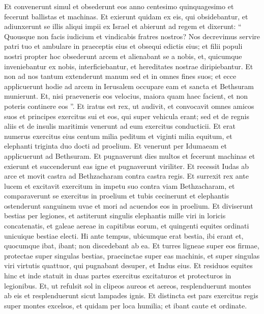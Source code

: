 \begin{biblechapter}
\begin{biblechapter}
\begin{biblechapter}
\begin{biblechapter}
\begin{biblechapter}
\begin{biblechapter}
\verse Et convenerunt simul et obsederunt eos anno centesimo quinquagesimo et fecerunt ballistas et machinas. 
\verse Et exierunt quidam ex eis, qui obsidebantur, et adiunxerunt se illis aliqui impii ex Israel 
\verse et abierunt ad regem et dixerunt: “ Quousque non facis iudicium et vindicabis fratres nostros? 
\verse Nos decrevimus servire patri tuo et ambulare in praeceptis eius et obsequi edictis eius; 
\verse et filii populi nostri propter hoc obsederunt arcem et alienabant se a nobis, et, quicumque inveniebantur ex nobis, interficiebantur, et hereditates nostrae diripiebantur. 
\verse Et non ad nos tantum extenderunt manum sed et in omnes fines suos; 
\verse et ecce applicuerunt hodie ad arcem in Ierusalem occupare eam et sancta et Bethsuram munierunt. 
\verse Et, nisi praeveneris eos velocius, maiora quam haec facient, et non poteris continere eos ”.
 \verse Et iratus est rex, ut audivit, et convocavit omnes amicos suos et principes exercitus sui et eos, qui super vehicula erant; 
\verse sed et de regnis aliis et de insulis maritimis venerunt ad eum exercitus conducticii. 
\verse Et erat numerus exercitus eius centum milia peditum et viginti milia equitum, et elephanti triginta duo docti ad proelium. 
\verse Et venerunt per Idumaeam et applicuerunt ad Bethsuram. Et pugnaverunt dies multos et fecerunt machinas et exierunt et succenderunt eas igne et pugnaverunt viriliter. 
\verse Et recessit Iudas ab arce et movit castra ad Bethzacharam contra castra regis. 
\verse Et surrexit rex ante lucem et excitavit exercitum in impetu suo contra viam Bethzacharam, et comparaverunt se exercitus in proelium et tubis cecinerunt 
 \verse et elephantis ostenderunt sanguinem uvae et mori ad acuendos eos in proelium. 
 \verse Et diviserunt bestias per legiones, et astiterunt singulis elephantis mille viri in loricis concatenatis, et galeae aereae in capitibus eorum, et quingenti equites ordinati unicuique bestiae electi. 
\verse Hi ante tempus, ubicumque erat bestia, ibi erant et, quocumque ibat, ibant; non discedebant ab ea. 
\verse Et turres ligneae super eos firmae, protectae super singulas bestias, praecinctae super eas machinis, et super singulas viri virtutis quattuor, qui pugnabant desuper, et Indus eius. 
\verse Et residuos equites hinc et inde statuit in duas partes exercitus excitaturos et protecturos in legionibus. 
\verse Et, ut refulsit sol in clipeos aureos et aereos, resplenduerunt montes ab eis et resplenduerunt sicut lampades ignis. 
\verse Et distincta est pars exercitus regis super montes excelsos, et quidam per loca humilia; et ibant caute et ordinate. 

\end{biblechapter}
\end{biblechapter}
\end{biblechapter}
\end{biblechapter}
\end{biblechapter}
\end{biblechapter}
